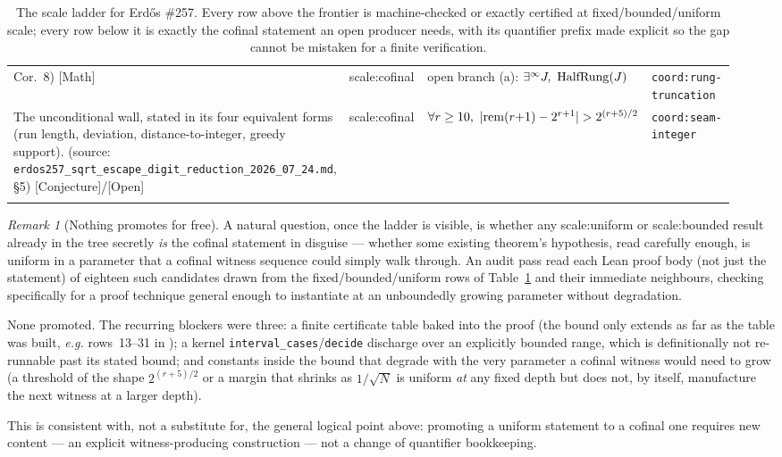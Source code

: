 \documentclass[11pt]{article}
\theoremstyle{plain}
\theoremstyle{definition}
\theoremstyle{remark}
\newtheorem{rem}[thm]{Remark}
\newcommand{\lean}[2]{\leanlink{#2}}
\let\origmathrm\mathrm
\renewcommand{\mathrm}[1]{\ifmmode\origmathrm{#1}\else\textrm{#1}\fi}%
\newcommand{\ev}[1]{{\small\textsf{[#1]}}\xspace}
\newcommand{\scale}[1]{{\small\textsf{scale:#1}}\xspace}
\newcommand{\coord}[1]{\texorpdfstring{{\small\nolinkurl{coord:#1}}}{coord:#1}\xspace}
\begin{document}
\begin{landscape}
\begin{longtable}{@{}p{0.42\linewidth}p{0.11\linewidth}p{0.29\linewidth}p{0.12\linewidth}@{}}
Cor.~8) \ev{Math}
& \scale{cofinal} & open branch (a): $\exists^\infty J,\ \mathrm{HalfRung}(J)$ & \coord{rung-truncation} \\
The unconditional wall, stated in its four equivalent forms (run length, deviation, distance-to-integer,
greedy support). (source: \texttt{erdos257\_sqrt\_escape\_digit\_reduction\_2026\_07\_24.md}, \S5)
\ev{Conjecture}/\ev{Open}
& \scale{cofinal} & $\forall r\ge10,\ |\mathrm{rem}(r{+}1)-2^{r+1}|>2^{(r+5)/2}$ & \coord{seam-integer} \\
\caption{The scale ladder for Erdős \#257. Every row above the frontier is machine-checked or
exactly certified at fixed/bounded/uniform scale; every row below it is exactly the cofinal
statement an open producer needs, with its quantifier prefix made explicit so the gap cannot be
mistaken for a finite verification.}
\label{tab:scale-ladder}
\end{longtable}
\end{landscape}
\endgroup

\begin{rem}[Nothing promotes for free]
\label{rem:promotion-audit}
A natural question, once the ladder is visible, is whether any \scale{uniform} or \scale{bounded}
result already in the tree secretly \emph{is} the cofinal statement in disguise — whether some
existing theorem's hypothesis, read carefully enough, is uniform in a parameter that a cofinal
witness sequence could simply walk through. An audit pass read each Lean proof body (not just the
statement) of eighteen such candidates drawn from the fixed/bounded/uniform rows of
Table~\ref{tab:scale-ladder} and their immediate neighbours, checking specifically for a proof
technique general enough to instantiate at an unboundedly growing parameter without degradation.

\par\medskip

None promoted. The recurring blockers were three: a finite certificate table baked into the proof
(the bound only extends as far as the table was built, \emph{e.g.} rows~13--31 in
\lean{seamUpperResetDyadicBandEscape\_through\_thirty}{HalfCylinderUpperResetBandCertificates.lean:78});
a kernel \texttt{interval\_cases}/\texttt{decide} discharge over an explicitly bounded range, which
is definitionally not re-runnable past its stated bound; and constants inside the bound that
degrade with the very parameter a cofinal witness would need to grow (a threshold of the shape
$2^{(r+5)/2}$ or a margin that shrinks as $1/\sqrt N$ is uniform \emph{at} any fixed depth but does
not, by itself, manufacture the next witness at a larger depth).

\par\medskip

This is consistent with, not a substitute for, the general logical point above: promoting a
uniform statement to a cofinal one requires new content — an explicit witness-producing
construction — not a change of quantifier bookkeeping.
\end{rem}
\end{document}

